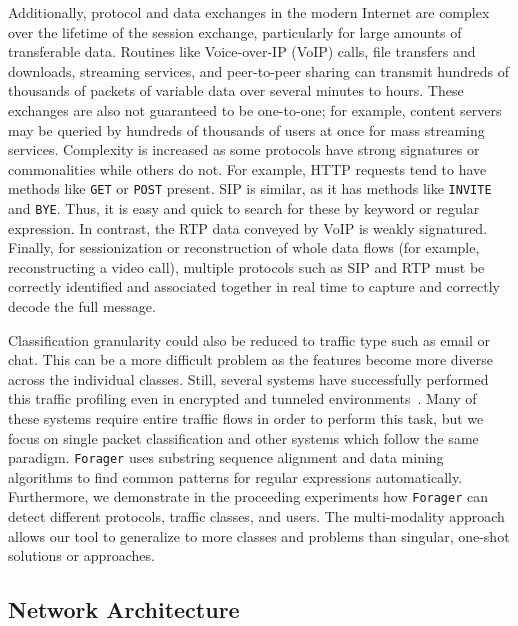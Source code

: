 Additionally, protocol and data exchanges in the modern Internet are complex over the lifetime of the session exchange, particularly for large amounts of transferable data. Routines like Voice-over-IP (VoIP) calls, file transfers and downloads, streaming services, and peer-to-peer sharing can transmit hundreds of thousands of packets of variable data over several minutes to hours. These exchanges are also not guaranteed to be one-to-one; for example, content servers may be queried by hundreds of thousands of users at once for mass streaming services. Complexity is increased as some protocols have strong signatures or commonalities while others do not. For example, HTTP requests tend to have methods like \texttt{GET} or \texttt{POST} present. SIP is similar, as it has methods like \texttt{INVITE} and \texttt{BYE}. Thus, it is easy and quick to search for these by keyword or regular expression. In contrast, the RTP data conveyed by VoIP is weakly signatured. Finally, for sessionization or reconstruction of whole data flows (for example, reconstructing a video call), multiple protocols such as SIP and RTP must be correctly identified and associated together in real time to capture and correctly decode the full message.

Classification granularity could also be reduced to traffic type such as email or chat. This can be a more difficult problem as the features become more diverse across the individual classes. Still, several systems have successfully performed this traffic profiling even in encrypted and tunneled environments~\cite{iscx-tor-paper, iscx-vpn-paper, deeppacket, didarknet}. Many of these systems require entire traffic flows in order to perform this task, but we focus on single packet classification and other systems which follow the same paradigm. \texttt{Forager} uses substring sequence alignment and data mining algorithms to find common patterns for regular expressions automatically. Furthermore, we demonstrate in the proceeding experiments how \texttt{Forager} can detect different protocols, traffic classes, and users. The multi-modality approach allows our tool to generalize to more classes and problems than singular, one-shot solutions or approaches.

\subsection{Network Architecture}

